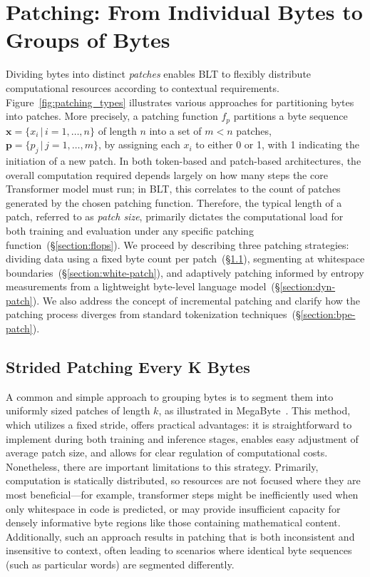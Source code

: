 \section{Patching: From Individual Bytes to Groups of Bytes}
\label{section:patching}

Dividing bytes into distinct \textit{patches} enables {\textsc BLT} to flexibly distribute computational resources according to contextual requirements. Figure~\ref{fig:patching_types} illustrates various approaches for partitioning bytes into patches. More precisely, a patching function $f_p$ partitions a byte sequence $\pmb{x} = \{x_i\,|\,i = 1, \ldots, n\}$ of length $n$ into a set of $m < n$ patches, $\pmb{p} = \{p_j\,|\,j = 1, \ldots, m\}$, by assigning each $x_i$ to either 0 or 1, with 1 indicating the initiation of a new patch. In both token-based and patch-based architectures, the overall computation required depends largely on how many steps the core Transformer model must run; in {\textsc BLT}, this correlates to the count of patches generated by the chosen patching function. Therefore, the typical length of a patch, referred to as \textit{patch size}, primarily dictates the computational load for both training and evaluation under any specific patching function~(\S\ref{section:flops}).  
We proceed by describing three patching strategies: dividing data using a fixed byte count per patch~(\S\ref{section:static-patch}), segmenting at whitespace boundaries~(\S\ref{section:white-patch}), and adaptively patching informed by entropy measurements from a lightweight byte-level language model~(\S\ref{section:dyn-patch}). We also address the concept of incremental patching and clarify how the patching process diverges from standard tokenization techniques~(\S\ref{section:bpe-patch}).

\subsection{Strided Patching Every K Bytes}
\label{section:static-patch}

A common and simple approach to grouping bytes is to segment them into uniformly sized patches of length $k$, as illustrated in MegaByte~\citep{yu2023megabyte}. This method, which utilizes a fixed stride, offers practical advantages: it is straightforward to implement during both training and inference stages, enables easy adjustment of average patch size, and allows for clear regulation of computational costs. Nonetheless, there are important limitations to this strategy. Primarily, computation is statically distributed, so resources are not focused where they are most beneficial—for example, transformer steps might be inefficiently used when only whitespace in code is predicted, or may provide insufficient capacity for densely informative byte regions like those containing mathematical content. Additionally, such an approach results in patching that is both inconsistent and insensitive to context, often leading to scenarios where identical byte sequences (such as particular words) are segmented differently.

